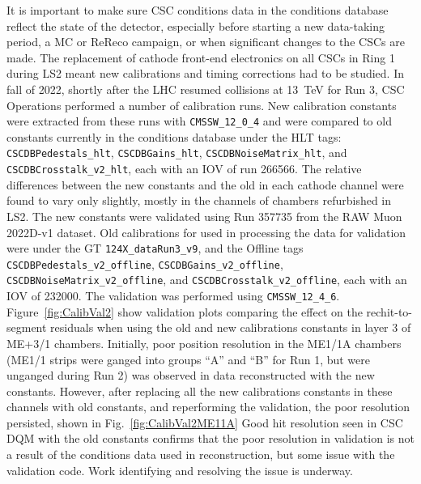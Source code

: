 It is important to make sure CSC conditions data in the conditions database reflect the state of the detector, especially before starting a new data-taking period, a MC or ReReco campaign, or when significant changes to the CSCs are made. The replacement of cathode front-end electronics on all CSCs in Ring 1 during LS2 meant new calibrations and timing corrections had to be studied. In fall of 2022, shortly after the LHC resumed collisions at \SI{13}{TeV} for Run 3, CSC Operations performed a number of calibration runs. New calibration constants were extracted from these runs with \texttt{CMSSW\_12\_0\_4} and were compared to old constants currently in the conditions database under the HLT tags: \texttt{CSCDBPedestals\_hlt}, \texttt{CSCDBGains\_hlt}, \texttt{CSCDBNoiseMatrix\_hlt}, and \texttt{CSCDBCrosstalk\_v2\_hlt}, each with an IOV of run 266566. The relative differences between the new constants and the old in each cathode channel were found to vary only slightly, mostly in the channels of chambers refurbished in LS2. The new constants were validated using Run 357735 from the RAW Muon 2022D-v1 dataset. Old calibrations for used in processing the data for validation were under the GT \texttt{124X\_dataRun3\_v9}, and the Offline tags \texttt{CSCDBPedestals\_v2\_offline}, \texttt{CSCDBGains\_v2\_offline}, \texttt{CSCDBNoiseMatrix\_v2\_offline}, and \texttt{CSCDBCrosstalk\_v2\_offline}, each with an IOV of 232000. The validation was performed using \texttt{CMSSW\_12\_4\_6}. Figure~\ref{fig:CalibVal2} show validation plots comparing the effect on the rechit-to-segment residuals when using the old and new calibrations constants in layer 3 of ME+3/1 chambers. Initially, poor position resolution in the ME1/1A chambers (ME1/1 strips were ganged into groups ``A'' and ``B'' for Run 1, but were unganged during Run 2) was observed in data reconstructed with the new constants. However, after replacing all the new calibrations constants in these channels with old constants, and reperforming the validation, the poor resolution persisted, shown in Fig.~\ref{fig:CalibVal2ME11A} Good hit resolution seen in CSC DQM with the old constants confirms that the poor resolution in validation is not a result of the conditions data used in reconstruction, but some issue with the validation code. Work identifying and resolving the issue is underway.

